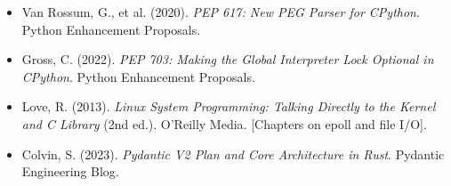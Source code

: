 \begin{itemize}[leftmargin=15pt]
  \item Van Rossum, G., et al. (2020). \textit{PEP 617: New PEG Parser for CPython}. Python Enhancement Proposals.
  \item Gross, C. (2022). \textit{PEP 703: Making the Global Interpreter Lock Optional in CPython}. Python Enhancement Proposals.
  \item Love, R. (2013). \textit{Linux System Programming: Talking Directly to the Kernel and C Library} (2nd ed.). O'Reilly Media. [Chapters on epoll and file I/O].
  \item Colvin, S. (2023). \textit{Pydantic V2 Plan and Core Architecture in Rust}. Pydantic Engineering Blog.
\end{itemize}
